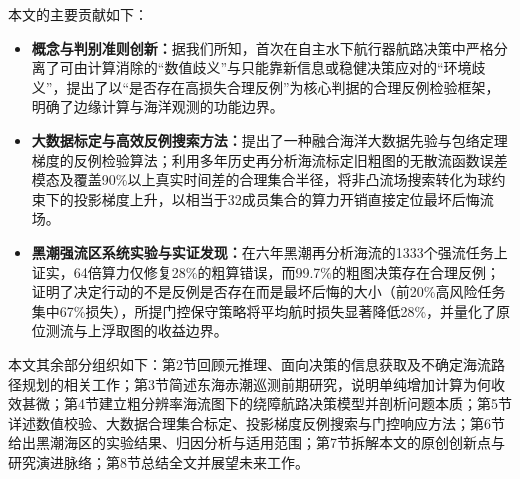 本文的主要贡献如下：
\begin{itemize}
    \item \textbf{概念与判别准则创新：}据我们所知，首次在自主水下航行器航路决策中严格分离了可由计算消除的“数值歧义”与只能靠新信息或稳健决策应对的“环境歧义”，提出了以“是否存在高损失合理反例”为核心判据的合理反例检验框架，明确了边缘计算与海洋观测的功能边界。
    \item \textbf{大数据标定与高效反例搜索方法：}提出了一种融合海洋大数据先验与包络定理梯度的反例检验算法；利用多年历史再分析海流标定旧粗图的无散流函数误差模态及覆盖90\%以上真实时间差的合理集合半径，将非凸流场搜索转化为球约束下的投影梯度上升，以相当于32成员集合的算力开销直接定位最坏后悔流场。
    \item \textbf{黑潮强流区系统实验与实证发现：}在六年黑潮再分析海流的1333个强流任务上证实，64倍算力仅修复28\%的粗算错误，而99.7\%的粗图决策存在合理反例；证明了决定行动的不是反例是否存在而是最坏后悔的大小（前20\%高风险任务集中67\%损失），所提门控保守策略将平均航时损失显著降低28\%，并量化了原位测流与上浮取图的收益边界。
\end{itemize}

本文其余部分组织如下：第2节回顾元推理、面向决策的信息获取及不确定海流路径规划的相关工作；第3节简述东海赤潮巡测前期研究，说明单纯增加计算为何收效甚微；第4节建立粗分辨率海流图下的绕障航路决策模型并剖析问题本质；第5节详述数值校验、大数据合理集合标定、投影梯度反例搜索与门控响应方法；第6节给出黑潮海区的实验结果、归因分析与适用范围；第7节拆解本文的原创创新点与研究演进脉络；第8节总结全文并展望未来工作。
